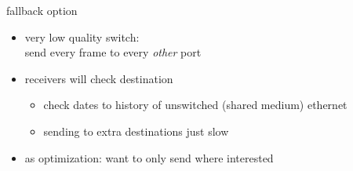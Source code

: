 

\begin{frame}{fallback option}
    \begin{itemize}
    \item very low quality switch: \\
    send every frame to every \textit{other} port
    \vspace{.5cm}
    \item receivers will check destination
        \begin{itemize}
        \item check dates to history of unswitched (shared medium) ethernet
        \item sending to extra destinations just slow
        \end{itemize}
    \vspace{.5cm}
    \item as optimization: want to only send where interested
    \end{itemize}
\end{frame}

